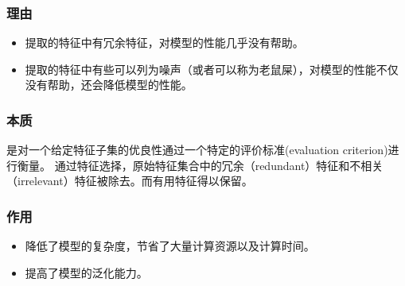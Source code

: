 \documentclass[UTF8]{ctexart}
\begin{document}
\subsubsection{理由}
\begin{itemize}
	\item 提取的特征中有冗余特征，对模型的性能几乎没有帮助。
	\item 提取的特征中有些可以列为噪声（或者可以称为老鼠屎），对模型的性能不仅没有帮助，还会降低模型的性能。
\end{itemize}
\subsubsection{本质}
是对一个给定特征子集的优良性通过一个特定的评价标准(evaluation criterion)进行衡量。
通过特征选择，原始特征集合中的冗余（redundant）特征和不相关（irrelevant）特征被除去。而有用特征得以保留。
\subsubsection{作用}
\begin{itemize}
	\item 降低了模型的复杂度，节省了大量计算资源以及计算时间。
	\item 提高了模型的泛化能力。
\end{itemize}
\end{document}
